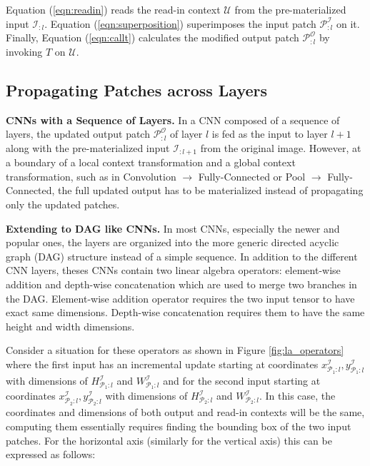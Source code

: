Equation (\ref{eqn:readin}) reads the read-in context $\mathcal{U}$ from the pre-materialized input $\mathcal{I}_{:l}$. Equation (\ref{eqn:superposition}) superimposes the input patch $\mathcal{P}^\mathcal{I}_{:l}$ on it.
Finally, Equation (\ref{eqn:callt}) calculates the modified output patch $\mathcal{P}^{\mathcal{O}}_{:l}$ by invoking $T$ on $\mathcal{U}$.


\subsection{Propagating Patches across Layers}

\vspace{2mm}
\noindent \textbf{CNNs with a Sequence of Layers.} In a CNN composed of a sequence of layers, the updated output patch $\mathcal{P}^{\mathcal{O}}_{:l}$ of layer $l$ is fed as the input to layer $l+1$ along with the pre-materialized input $\mathcal{I}_{:l+1}$ from the original image.
However, at a boundary of a local context transformation and a global context transformation, such as in Convolution $\rightarrow$ Fully-Connected or Pool $\rightarrow$ Fully-Connected, the full updated output has to be materialized instead of propagating only the updated patches.

\vspace{2mm}
\noindent \textbf{Extending to DAG like CNNs.} In most CNNs, especially the newer and popular ones, the layers are organized into the more generic directed acyclic graph (DAG) structure instead of a simple sequence.
In addition to the different CNN layers, theses CNNs contain two linear algebra operators: element-wise addition and depth-wise concatenation which are used to merge two branches in the DAG. 
Element-wise addition operator requires the two input tensor to have exact same dimensions.
Depth-wise concatenation requires them to have the same height and width dimensions.

Consider a situation for these operators as shown in Figure \ref{fig:la_operators} where the first input has an incremental update starting at coordinates $x^\mathcal{I}_{\mathcal{P}_1:l},y^\mathcal{I}_{\mathcal{P}_1:l}$ with dimensions of $H^\mathcal{I}_{\mathcal{P}_1:l}$ and $W^\mathcal{I}_{\mathcal{P}_1:l}$ and for the second input starting at coordinates $x^\mathcal{I}_{\mathcal{P}_2:l},y^\mathcal{I}_{\mathcal{P}_2:l}$ with dimensions of $H^\mathcal{I}_{\mathcal{P}_2:l}$ and $W^\mathcal{I}_{\mathcal{P}_2:l}$.
In this case, the coordinates and dimensions of both output and read-in contexts will be the same, computing them essentially requires finding the bounding box of the two input patches.
For the horizontal axis (similarly for the vertical axis) this can be expressed as follows:

